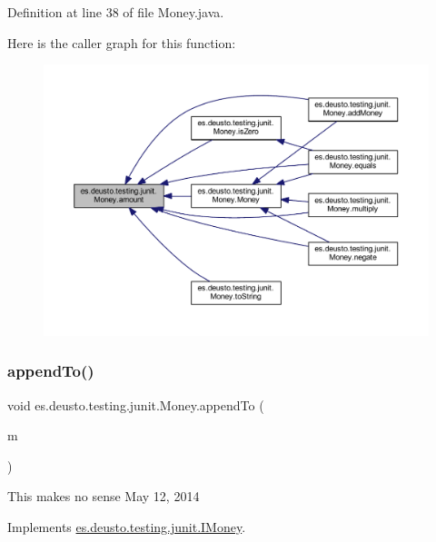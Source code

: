 Definition at line 38 of file Money.\+java.

Here is the caller graph for this function\+:
\nopagebreak
\begin{figure}[H]
\begin{center}
\leavevmode
\includegraphics[width=350pt]{classes_1_1deusto_1_1testing_1_1junit_1_1_money_a9bef5d9027f270e8ce0303e4f929bbd5_icgraph}
\end{center}
\end{figure}
\mbox{\label{classes_1_1deusto_1_1testing_1_1junit_1_1_money_aa9a6df9f35118060914ae6e8f74d1d51}} 
\subsubsection{\texorpdfstring{append\+To()}{appendTo()}}
{\footnotesize\ttfamily void es.\+deusto.\+testing.\+junit.\+Money.\+append\+To (\begin{DoxyParamCaption}\item[{\mbox{\hyperlink{classes_1_1deusto_1_1testing_1_1junit_1_1_money_bag}{Money\+Bag}}}]{m }\end{DoxyParamCaption})}

This makes no sense May 12, 2014 

Implements \mbox{\hyperlink{interfacees_1_1deusto_1_1testing_1_1junit_1_1_i_money_ae45bc758e69a0017f083f11d050c53cb}{es.\+deusto.\+testing.\+junit.\+I\+Money}}.



